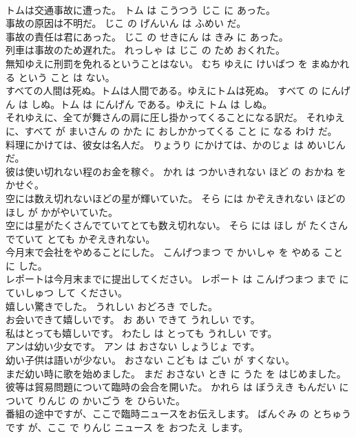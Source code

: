 \documentclass[8pt]{extreport}
\begin{document}
\begin{CJK}{UTF8}{min}
\\	トムは交通事故に遭った。	トム は こうつう じこ に あった。	
\\	事故の原因は不明だ。	じこ の げんいん は ふめい だ。	
\\	事故の責任は君にあった。	じこ の せきにん は きみ に あった。	
\\	列車は事故のため遅れた。	れっしゃ は じこ の ため おくれた。	
\\	無知ゆえに刑罰を免れるということはない。	むち ゆえに けいばつ を まぬかれる という こと は ない。	
\\	すべての人間は死ぬ。トムは人間である。ゆえにトムは死ぬ。	すべて の にんげん は しぬ。トム は にんげん である。ゆえに トム は しぬ。	
\\	それゆえに、全てが舞さんの肩に圧し掛かってくることになる訳だ。	それゆえ に、すべて が まいさん の かた に おしかかってくる こと に なる わけ だ。	
\\	料理にかけては、彼女は名人だ。	りょうり にかけては、かのじょ は めいじん だ。	
\\	彼は使い切れない程のお金を稼ぐ。	かれ は つかいきれない ほど の おかね を かせぐ。	
\\	空には数え切れないほどの星が輝いていた。	そら には かぞえきれない ほどの ほし が かがやいていた。	
\\	空には星がたくさんでていてとても数え切れない。	そら には ほし が たくさん でていて とても かぞえきれない。	
\\	今月末で会社をやめることにした。	こんげつまつ で かいしゃ を やめる こと に した。	
\\	レポートは今月末までに提出してください。	レポート は こんげつまつ まで に ていしゅつ して ください。	
\\	嬉しい驚きでした。	うれしい おどろき でした。	
\\	お会いできて嬉しいです。	お あい できて うれしい です。	
\\	私はとっても嬉しいです。	わたし は とっても うれしい です。	
\\	アンは幼い少女です。	アン は おさない しょうじょ です。	
\\	幼い子供は語いが少ない。	おさない こども は ごい が すくない。	
\\	まだ幼い時に歌を始めました。	まだ おさない とき に うた を はじめました。	
\\	彼等は貿易問題について臨時の会合を開いた。	かれら は ぼうえき もんだい について りんじ の かいごう を ひらいた。	
\\	番組の途中ですが、ここで臨時ニュースをお伝えします。	ばんぐみ の とちゅう です が、ここ で りんじ ニュース を おつたえ します。	

\end{CJK}
\end{document}
